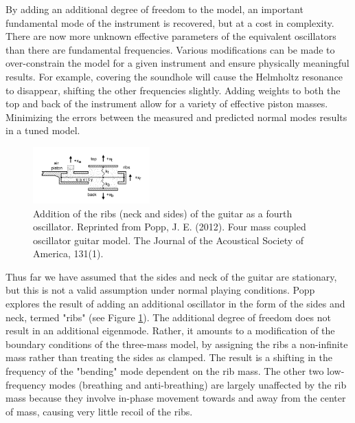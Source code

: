 \documentclass[
reprint,amsmath,amssymb,showpacs,citeautoscript,prb,twocolumn,notitlepage,floatfix
]{revtex4-1}
\begin{document}
By adding an additional degree of freedom to the model, an important fundamental mode of the instrument is recovered, but at a cost in complexity. There are now more unknown effective parameters of the equivalent oscillators than there are fundamental frequencies. Various modifications can be made to over-constrain the model for a given instrument and ensure physically meaningful results. For example, covering the soundhole will cause the Helmholtz resonance to disappear, shifting the other frequencies slightly. Adding weights to both the top and back of the instrument allow for a variety of effective piston masses. Minimizing the errors between the measured and predicted normal modes results in a tuned model.\cite{french2008engineering}

\begin{figure}[ht]
    \begin{center}
        \includegraphics[width=0.4\textwidth]{images/popp2012-four-mass-model.png}
        \caption{Addition of the ribs (neck and sides) of the guitar as a fourth oscillator. Reprinted from Popp, J. E. (2012). Four mass coupled oscillator guitar model. The Journal of the Acoustical Society of America, 131(1).}
        \label{fig:four-mass-model}
    \end{center}
\end{figure}

Thus far we have assumed that the sides and neck of the guitar are stationary, but this is not a valid assumption under normal playing conditions. Popp\cite{PoppJohnE2012Fmco} explores the result of adding an additional oscillator in the form of the sides and neck, termed "ribs" (see Figure \ref{fig:four-mass-model}). The additional degree of freedom does not result in an additional eigenmode. Rather, it amounts to a modification of the boundary conditions of the three-mass model, by assigning the ribs a non-infinite mass rather than treating the sides as clamped. The result is a shifting in the frequency of the "bending" mode dependent on the rib mass. The other two low-frequency modes (breathing and anti-breathing) are largely unaffected by the rib mass because they involve in-phase movement towards and away from the center of mass, causing very little recoil of the ribs.
\end{document}
